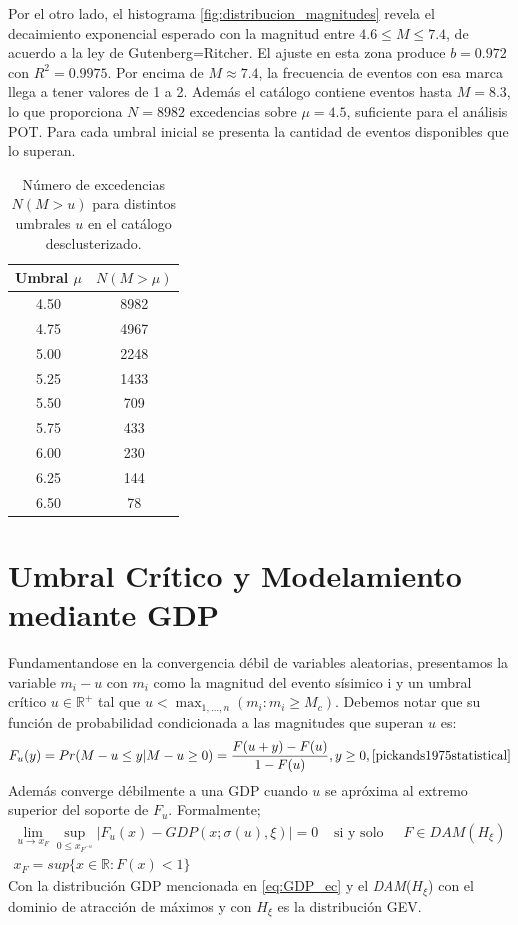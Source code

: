 Por el otro lado, el histograma \ref{fig:distribucion_magnitudes} revela el decaimiento exponencial esperado con la magnitud entre $4.6 \le M \le 7.4$, de acuerdo a la ley de Gutenberg=Ritcher. El ajuste en esta zona produce $b= 0.972$ con $R^2=0.9975$.
Por encima de $M \approx 7.4$, la frecuencia de eventos con esa marca llega a tener valores de 1 a 2. Además el catálogo contiene eventos hasta $M=8.3$, lo que proporciona $N=8982$ excedencias sobre $\mu=4.5$, 
suficiente para el análisis POT. Para cada umbral inicial se presenta la cantidad de eventos disponibles que lo superan.
\begin{table}[H]
    \centering
    \begin{tabular}{cc}
        \toprule
        Umbral $\mu$ & $N(M > \mu)$ \\
        \midrule
        4.50 & 8982 \\
        4.75 & 4967 \\
        5.00 & 2248 \\
        5.25 & 1433 \\
        5.50 & 709  \\
        5.75 & 433  \\
        6.00 & 230  \\
        6.25 & 144  \\
        6.50 & 78   \\
        \bottomrule
    \end{tabular}
    \caption{Número de excedencias $N(M > u)$ para distintos umbrales $u$ en el catálogo desclusterizado.}
    \label{tab:excedencias}
\end{table}



\section{Umbral Crítico y Modelamiento mediante GDP}
Fundamentandose en la convergencia débil de variables aleatorias, presentamos la variable $m_i-u$ con $m_i$ como la magnitud del evento sísimico i y un umbral crítico $u\in \mathbb{R}^+$ tal que $u<\max_{1,\dots,n}(m_i: m_i\geq M_c)$. 
Debemos notar que su función de probabilidad condicionada a las magnitudes que superan $u$ es:
\begin{equation}
    F_u (y)=Pr(M-u\leq y| M-u\ge 0)=\frac{F(u+y)-F(u)}{1-F(u)}, y\ge 0,
    \cite{pickands1975statistical}
\end{equation}
Además converge débilmente a una GDP cuando $u$ se apróxima al extremo superior del soporte de $F_u$. Formalmente;
\begin{align}
    \lim_{u \to x_F} \sup_{0\leq x_{F^{-u}}} \left| F_u(x) - GDP(x; \sigma(u), \xi) \right| = 0 & \text{ si y solo si} & F\in DAM(H_\xi)\\
    x_F=sup\{x \in \mathbb{R}: F(x)< 1\}
\end{align}
Con la distribución GDP mencionada en \ref{eq:GDP_ec} y el \textit{DAM}($H_\xi$) con el dominio de atracción de máximos \cite{DAM} y con $H_\xi$ es la distribución GEV.

